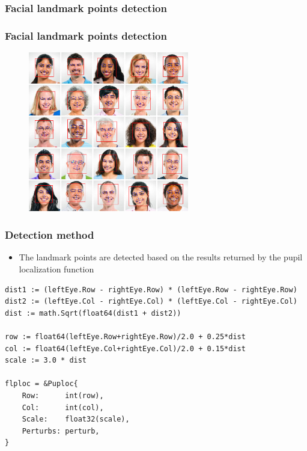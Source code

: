 \documentclass[9pt]{beamer}
\begin{document}
\begin{frame}[fragile]
\frametitle{Facial landmark points detection}


\end{frame}

\begin{frame}[fragile]
\frametitle{Facial landmark points detection}


\begin{figure}[h]
\begin{center}
\includegraphics[width=7cm,height=7cm]{assets/pigo_landmark.png}
\end{center}

\end{figure}


\end{frame}

\begin{frame}[fragile]
\frametitle{Detection method}


\begin{itemize}
\item The landmark points are detected based on the results returned by the pupil localization function
\end{itemize}


\begin{verbatim}
dist1 := (leftEye.Row - rightEye.Row) * (leftEye.Row - rightEye.Row)
dist2 := (leftEye.Col - rightEye.Col) * (leftEye.Col - rightEye.Col)
dist := math.Sqrt(float64(dist1 + dist2))

row := float64(leftEye.Row+rightEye.Row)/2.0 + 0.25*dist
col := float64(leftEye.Col+rightEye.Col)/2.0 + 0.15*dist
scale := 3.0 * dist

flploc = &Puploc{
    Row:      int(row),
    Col:      int(col),
    Scale:    float32(scale),
    Perturbs: perturb,
}

\end{verbatim}



\end{frame}
\end{document}
